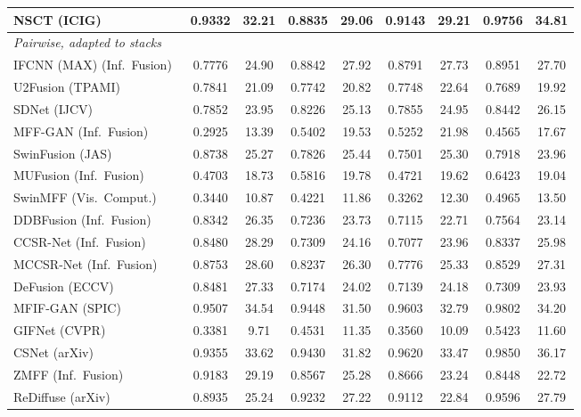 \begin{table}[!t]
{\begin{tabular}{lcccccccc}
NSCT (ICIG)~\cite{yang2007image} & 0.9332 & 32.21 & 0.8835 & 29.06 & 0.9143 & 29.21 & 0.9756 & 34.81 \\
\midrule
\multicolumn{9}{l}{\textit{Pairwise, adapted to stacks}} \\
IFCNN (MAX) (Inf.\ Fusion)~\cite{zhang2020ifcnn} & 0.7776 & 24.90 & 0.8842 & 27.92 & 0.8791 & 27.73 & 0.8951 & 27.70 \\
U2Fusion (TPAMI)~\cite{xu2020u2fusion} & 0.7841 & 21.09 & 0.7742 & 20.82 & 0.7748 & 22.64 & 0.7689 & 19.92 \\
SDNet (IJCV)~\cite{zhang2021sdnet} & 0.7852 & 23.95 & 0.8226 & 25.13 & 0.7855 & 24.95 & 0.8442 & 26.15 \\
MFF-GAN (Inf.\ Fusion)~\cite{zhang2021mff} & 0.2925 & 13.39 & 0.5402 & 19.53 & 0.5252 & 21.98 & 0.4565 & 17.67 \\
SwinFusion (JAS)~\cite{ma2022swinfusion} & 0.8738 & 25.27 & 0.7826 & 25.44 & 0.7501 & 25.30 & 0.7918 & 23.96 \\
MUFusion (Inf.\ Fusion)~\cite{cheng2023mufusion} & 0.4703 & 18.73 & 0.5816 & 19.78 & 0.4721 & 19.62 & 0.6423 & 19.04 \\
SwinMFF (Vis.\ Comput.)~\cite{xie2024swinmff} & 0.3440 & 10.87 & 0.4221 & 11.86 & 0.3262 & 12.30 & 0.4965 & 13.50 \\
DDBFusion (Inf.\ Fusion)~\cite{zhang2025ddbfusion} & 0.8342 & 26.35 & 0.7236 & 23.73 & 0.7115 & 22.71 & 0.7564 & 23.14 \\
CCSR-Net (Inf.\ Fusion)~\cite{ZHENG2025102974} & 0.8480 & 28.29 & 0.7309 & 24.16 & 0.7077 & 23.96 & 0.8337 & 25.98 \\
MCCSR-Net (Inf.\ Fusion)~\cite{ZHENG2025102974} & 0.8753 & 28.60 & 0.8237 & 26.30 & 0.7776 & 25.33 & 0.8529 & 27.31 \\
DeFusion (ECCV)~\cite{liang2022defusion} & 0.8481 & 27.33 & 0.7174 & 24.02 & 0.7139 & 24.18 & 0.7309 & 23.93 \\
MFIF-GAN (SPIC)~\cite{wang2021mfifgan} & 0.9507 & 34.54 & 0.9448 & 31.50 & 0.9603 & 32.79 & 0.9802 & 34.20 \\
GIFNet (CVPR)~\cite{cheng2025gifnet} & 0.3381 & 9.71 & 0.4531 & 11.35 & 0.3560 & 10.09 & 0.5423 & 11.60 \\
CSNet (arXiv)~\cite{csnet2026} & 0.9355 & 33.62 & 0.9430 & 31.82 & 0.9620 & 33.47 & 0.9850 & 36.17 \\
ZMFF (Inf.\ Fusion)~\cite{hu2023zmff} & 0.9183 & 29.19 & 0.8567 & 25.28 & 0.8666 & 23.24 & 0.8448 & 22.72 \\
ReDiffuse (arXiv)~\cite{rediffuse2026} & 0.8935 & 25.24 & 0.9232 & 27.22 & 0.9112 & 22.84 & 0.9596 & 27.79 \\

\end{tabular}}
\end{table}
